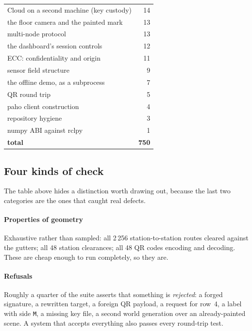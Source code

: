 \begin{table}[!t]
\begin{tabular}{@{}p{}r@{}}
Cloud on a second machine (key custody)       &  14 \\
the floor camera and the painted mark         &  13 \\
multi-node protocol                           &  13 \\
the dashboard's session controls              &  12 \\
ECC: confidentiality and origin               &  11 \\
sensor field structure                        &   9 \\
the offline demo, as a subprocess             &   7 \\
QR round trip                                 &   5 \\
paho client construction                      &   4 \\
repository hygiene                            &   3 \\
numpy ABI against rclpy                       &   1 \\
\midrule
\textbf{total}                                & \textbf{750} \\
\bottomrule
\end{tabular}
\end{table}

\subsection{Four kinds of check}

The table above hides a distinction worth drawing out, because the last
two categories are the ones that caught real defects.

\paragraph{Properties of geometry} Exhaustive rather than sampled: all
2\,256 station-to-station routes cleared against the gutters; all 48
station clearances; all 48 QR codes encoding and decoding. These are
cheap enough to run completely, so they are.

\paragraph{Refusals} Roughly a quarter of the suite asserts that
something is \emph{rejected}: a forged signature, a rewritten target, a
foreign QR payload, a request for row~4, a label with side \texttt{M}, a
missing key file, a second world generation over an already-painted
scene. A system that accepts everything also passes every round-trip
test.

